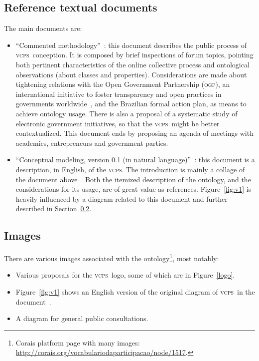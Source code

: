 \documentclass[10pt,letterpaper]{article}
\newcommand{\vcps}{\textsc{vcps}}
\newcommand{\ogp}{\textsc{ogp}}
\begin{document}
\subsection{Reference textual documents}\label{refDocs}
The main documents are:
\begin{itemize}
    \item ``Commented methodology''~\cite{metodologia}:
    this document describes the public process of \vcps\ conception.
    It is composed by brief inspections of forum topics,
    pointing both pertinent characteristics of the online collective process and ontological observations 
    (about classes and properties).
    Considerations are made about tightening relations with the Open Government Partnership (\ogp),
    an international initiative to foster transparency and open practices in governments worldwide~\cite{OGP},
    and the Brazilian formal action plan, as means to achieve ontology usage. 
    There is also a proposal of a systematic study of electronic government initiatives,
    so that the \vcps\ might be better contextualized.
    This document ends by proposing an agenda of meetings with academics, entrepreneurs and government parties.
    \item ``Conceptual modeling, version 0.1 (in natural language)''~\cite{conceptualMod}: 
    this document is a description, in English, of the \vcps.
    The introduction is mainly a collage of the document above~\cite{metodologia}.
    Both the itemized description of the ontology, and the considerations for its usage,
    are of great value as references.
    Figure~\ref{fig:v1} is heavily influenced by a diagram related to this document and further described in Section~\ref{sec:im}.
\end{itemize}

\subsection{Images}\label{sec:im}
There are various images associated with the ontology\footnote{Corais platform page with many images:
\url{http://corais.org/vocabulariodaparticipacao/node/1517}.}, most notably:
\begin{itemize}
    \item Various proposals for the \vcps\ logo, some of which are in Figure~\ref{logo}.
    \item Figure~\ref{fig:v1} shows an English version 
    of the original diagram of \vcps\ in the document~\cite{conceptualMod}.
    \item A diagram for general public consultations.
\end{itemize}
\end{document}
